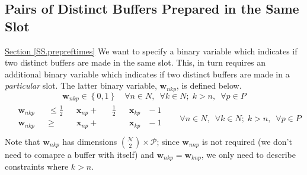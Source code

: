 \subsection{Pairs of Distinct Buffers Prepared in the Same Slot}
\label{SS.constr6}
\hyperref[SS.prepreftimes]{Section \ref*{SS.prepreftimes}}
We want to specify a binary variable which indicates if two distinct
buffers are made in the same slot.
This, in turn requires an additional binary variable which indicates if two
distinct buffers are made in a \emph{particular} slot.
The latter binary variable, $ \boldsymbol{w}_{nkp} $, is defined below.
\begin{equation}
    \boldsymbol{w}_{nkp} \in \left\{ 0, 1 \right\} \quad \forall n \in N, 
    \enspace \forall k \in N; \; k > n, \enspace \forall p \in P
    \label{eq.w}
\end{equation}
\begin{equation}
    \begin{split}
        \begin{alignedat}{11}
            &\boldsymbol{w}_{nkp} {}&&\le{} \tfrac{1}{2} &&\boldsymbol{x}_{np}
            {}+{} &&\tfrac{1}{2} && \boldsymbol{x}_{kp} &{}-{} 1\\
            &\boldsymbol{w}_{nkp} {}&&\ge{} &&\boldsymbol{x}_{np} {}+{} &&
            && \boldsymbol{x}_{kp} &{}-{} 1\\
        \end{alignedat}
    \end{split}
    \quad
    \begin{split}
        \forall n \in N, \enspace \forall k \in N; \; k > n, \enspace 
        \forall p \in P
    \end{split}
    \label{eq.w1}
\end{equation}
Note that $\boldsymbol{w}_{nkp}$ has dimensions
$\binom{\mathcal{N}}{2} \times \mathcal{P}$; since $\boldsymbol{w}_{nnp}$ is
not required (we don't need to comapre a buffer with itself) and
$\boldsymbol{w}_{nkp} = \boldsymbol{w}_{knp}$, we only need to describe
constraints where $k > n$.

